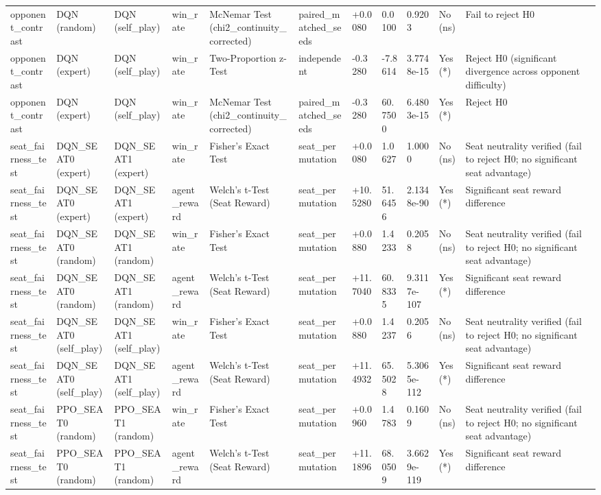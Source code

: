 \begin{table}
\begin{tabular}{lllllllllll}
opponent\_contrast & DQN (random) & DQN (self\_play) & win\_rate & McNemar Test (chi2\_continuity\_corrected) & paired\_matched\_seeds & +0.0080 & 0.0100 & 0.9203 & No (ns) & Fail to reject H0 \\
opponent\_contrast & DQN (expert) & DQN (self\_play) & win\_rate & Two-Proportion z-Test & independent & -0.3280 & -7.8614 & 3.7748e-15 & Yes (*) & Reject H0 (significant divergence across opponent difficulty) \\
opponent\_contrast & DQN (expert) & DQN (self\_play) & win\_rate & McNemar Test (chi2\_continuity\_corrected) & paired\_matched\_seeds & -0.3280 & 60.7500 & 6.4803e-15 & Yes (*) & Reject H0 \\
seat\_fairness\_test & DQN\_SEAT0 (expert) & DQN\_SEAT1 (expert) & win\_rate & Fisher's Exact Test & seat\_permutation & +0.0080 & 1.0627 & 1.0000 & No (ns) & Seat neutrality verified (fail to reject H0; no significant seat advantage) \\
seat\_fairness\_test & DQN\_SEAT0 (expert) & DQN\_SEAT1 (expert) & agent\_reward & Welch's t-Test (Seat Reward) & seat\_permutation & +10.5280 & 51.6456 & 2.1348e-90 & Yes (*) & Significant seat reward difference \\
seat\_fairness\_test & DQN\_SEAT0 (random) & DQN\_SEAT1 (random) & win\_rate & Fisher's Exact Test & seat\_permutation & +0.0880 & 1.4233 & 0.2058 & No (ns) & Seat neutrality verified (fail to reject H0; no significant seat advantage) \\
seat\_fairness\_test & DQN\_SEAT0 (random) & DQN\_SEAT1 (random) & agent\_reward & Welch's t-Test (Seat Reward) & seat\_permutation & +11.7040 & 60.8335 & 9.3117e-107 & Yes (*) & Significant seat reward difference \\
seat\_fairness\_test & DQN\_SEAT0 (self\_play) & DQN\_SEAT1 (self\_play) & win\_rate & Fisher's Exact Test & seat\_permutation & +0.0880 & 1.4237 & 0.2056 & No (ns) & Seat neutrality verified (fail to reject H0; no significant seat advantage) \\
seat\_fairness\_test & DQN\_SEAT0 (self\_play) & DQN\_SEAT1 (self\_play) & agent\_reward & Welch's t-Test (Seat Reward) & seat\_permutation & +11.4932 & 65.5028 & 5.3065e-112 & Yes (*) & Significant seat reward difference \\
seat\_fairness\_test & PPO\_SEAT0 (random) & PPO\_SEAT1 (random) & win\_rate & Fisher's Exact Test & seat\_permutation & +0.0960 & 1.4783 & 0.1609 & No (ns) & Seat neutrality verified (fail to reject H0; no significant seat advantage) \\
seat\_fairness\_test & PPO\_SEAT0 (random) & PPO\_SEAT1 (random) & agent\_reward & Welch's t-Test (Seat Reward) & seat\_permutation & +11.1896 & 68.0509 & 3.6629e-119 & Yes (*) & Significant seat reward difference \\
\bottomrule
\end{tabular}
\end{table}
